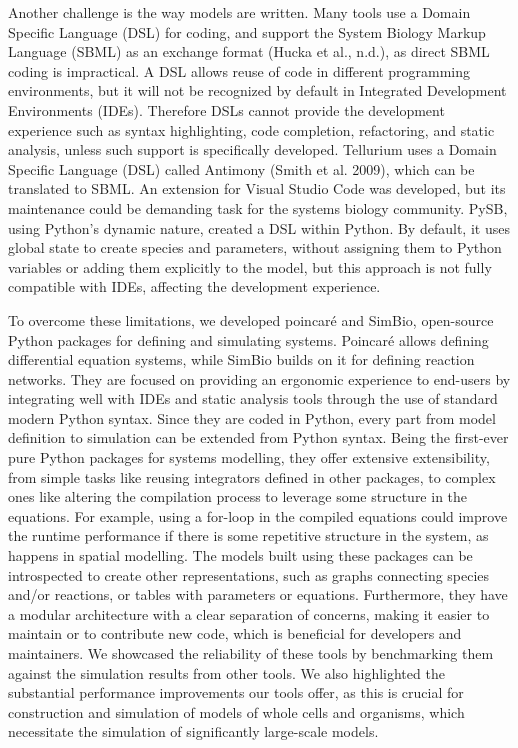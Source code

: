 \documentclass[
  letterpaper,
  DIV=11,
  numbers=noendperiod]{scrartcl}
\begin{document}
Another challenge is the way models are written. Many tools use a Domain
Specific Language (DSL) for coding, and support the System Biology
Markup Language (SBML) as an exchange format (Hucka et al., n.d.), as
direct SBML coding is impractical. A DSL allows reuse of code in
different programming environments, but it will not be recognized by
default in Integrated Development Environments (IDEs). Therefore DSLs
cannot provide the development experience such as syntax highlighting,
code completion, refactoring, and static analysis, unless such support
is specifically developed. Tellurium uses a Domain Specific Language
(DSL) called Antimony (Smith et al. 2009), which can be translated to
SBML. An extension for Visual Studio Code was developed, but its
maintenance could be demanding task for the systems biology community.
PySB, using Python's dynamic nature, created a DSL within Python. By
default, it uses global state to create species and parameters, without
assigning them to Python variables or adding them explicitly to the
model, but this approach is not fully compatible with IDEs, affecting
the development experience.

To overcome these limitations, we developed poincaré and SimBio,
open-source Python packages for defining and simulating systems.
Poincaré allows defining differential equation systems, while SimBio
builds on it for defining reaction networks. They are focused on
providing an ergonomic experience to end-users by integrating well with
IDEs and static analysis tools through the use of standard modern Python
syntax. Since they are coded in Python, every part from model definition
to simulation can be extended from Python syntax. Being the first-ever
pure Python packages for systems modelling, they offer extensive
extensibility, from simple tasks like reusing integrators defined in
other packages, to complex ones like altering the compilation process to
leverage some structure in the equations. For example, using a for-loop
in the compiled equations could improve the runtime performance if there
is some repetitive structure in the system, as happens in spatial
modelling. The models built using these packages can be introspected to
create other representations, such as graphs connecting species and/or
reactions, or tables with parameters or equations. Furthermore, they
have a modular architecture with a clear separation of concerns, making
it easier to maintain or to contribute new code, which is beneficial for
developers and maintainers. We showcased the reliability of these tools
by benchmarking them against the simulation results from other tools. We
also highlighted the substantial performance improvements our tools
offer, as this is crucial for construction and simulation of models of
whole cells and organisms, which necessitate the simulation of
significantly large-scale models.
\end{document}

